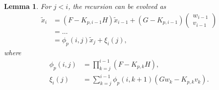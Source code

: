 \documentclass[a4 paper]{article}
\numberwithin{equation}{section}
\theoremstyle{boldStyle}
\theoremstyle{boldBlueStyle}
\newtheorem{lemma}{Lemma}[section]
\theoremstyle{boldPurpleStyle}
\theoremstyle{boldRedStyle}
\theoremstyle{boldGreenStyle}
\begin{document}
\begin{lemma}
  For \( j < i \), the recursion can be evolved as
  \begin{align*}
      \tilde{x}_i &= (F - K_{p,i-1}H) \tilde{x}_{i-1} + (G - K_{p,i-1})
      \begin{pmatrix}
          w_{i-1} \\
          v_{i-1}
      \end{pmatrix} \\
      &= \ldots \\
      &= \phi_p(i, j) \tilde{x}_j + \xi_i(j),
  \end{align*}
  where
  \begin{align*}
      \phi_p(i, j) &= \prod_{k=j}^{i-1} (F - K_{p,k}H), \\
      \xi_i(j) &= \sum_{k=j}^{i-1} \phi_p(i, k+1) (G w_k - K_{p,k} v_k).
  \end{align*}
  \end{lemma}  
\end{document}
